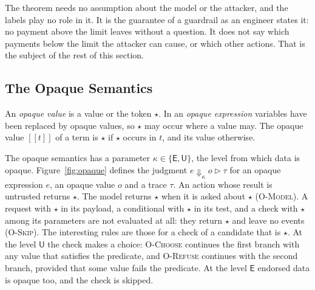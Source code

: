 \documentclass[acmsmall,nonacm,screen]{acmart}
\newcommand{\kw}[1]{\mathsf{#1}}
\newcommand{\E}{\kw{E}}
\newcommand{\U}{\kw{U}}
\newcommand{\oev}[4]{#1 \Downarrow_{#2} #3 \triangleright #4}
\newcommand{\sem}[1]{[\![#1]\!]}
\newcommand{\op}{\star}
\begin{document}
The theorem needs no assumption about the model or the attacker, and the labels play no role
in it. It is the guarantee of a guardrail as an engineer states it: no payment above the
limit leaves without a question. It does not say which payments below the limit the attacker
can cause, or which other actions. That is the subject of the rest of this section.

\subsection{The Opaque Semantics}

An \emph{opaque value} is a value or the token $\op$. In an \emph{opaque expression}
variables have been replaced by opaque values, so $\op$ may occur where a value may. The
opaque value $\sem{t}$ of a term is $\op$ if $\op$ occurs in $t$, and its value otherwise.

The opaque semantics has a parameter $\kappa \in \{\E, \U\}$, the level from which data is
opaque. Figure~\ref{fig:opaque} defines the judgment $\oev{e}{\kappa}{o}{\tau}$ for an opaque
expression $e$, an opaque value $o$ and a trace $\tau$. An action whose result is untrusted
returns $\op$. The model returns $\op$ when it is asked about $\op$ (\textsc{O-Model}). A
request with $\op$ in its payload, a conditional with $\op$ in its test, and a check with
$\op$ among its parameters are not evaluated at all: they return $\op$ and leave no events
(\textsc{O-Skip}). The interesting rules are those for a check of a candidate that is $\op$.
At the level $\U$ the check makes a choice: \textsc{O-Choose} continues the first branch with
any value that satisfies the predicate, and \textsc{O-Refuse} continues with the second
branch, provided that some value fails the predicate. At the level $\E$ endorsed data is
opaque too, and the check is skipped.
\end{document}
